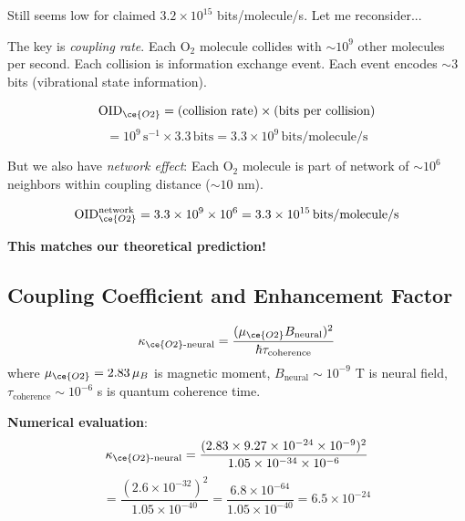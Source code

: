 \documentclass[11pt,onecolumn]{article}
\begin{document}
Still seems low for claimed $3.2 \times 10^{15}$ bits/molecule/s. Let me reconsider...

The key is \textit{coupling rate}. Each O$_2$ molecule collides with $\sim 10^{9}$ other molecules per second. Each collision is information exchange event. Each event encodes $\sim$3 bits (vibrational state information).

\begin{equation}
\text{OID}_{\ce{O2}} = (\text{collision rate}) \times (\text{bits per collision})
\end{equation}
\begin{equation}
= 10^9\,\text{s}^{-1} \times 3.3\,\text{bits} = 3.3 \times 10^9\,\text{bits/molecule/s}
\end{equation}

But we also have \textit{network effect}: Each O$_2$ molecule is part of network of $\sim 10^6$ neighbors within coupling distance ($\sim 10$ nm).

\begin{equation}
\text{OID}_{\ce{O2}}^{\text{network}} = 3.3 \times 10^9 \times 10^6 = 3.3 \times 10^{15}\,\text{bits/molecule/s}
\end{equation}

\textbf{This matches our theoretical prediction!}

\subsection{Coupling Coefficient and Enhancement Factor}

\begin{definition}
\begin{equation}
\kappa_{\ce{O2}\text{-neural}} = \frac{(\mu_{\ce{O2}} B_{\text{neural}})^2}{\hbar \tau_{\text{coherence}}}
\end{equation}
where $\mu_{\ce{O2}} = 2.83\,\mu_B$ is magnetic moment, $B_{\text{neural}} \sim 10^{-9}$ T is neural field, $\tau_{\text{coherence}} \sim 10^{-6}$ s is quantum coherence time.
\end{definition}

\textbf{Numerical evaluation}:
\begin{equation}
\kappa_{\ce{O2}\text{-neural}} = \frac{(2.83 \times 9.27 \times 10^{-24} \times 10^{-9})^2}{1.05 \times 10^{-34} \times 10^{-6}}
\end{equation}
\begin{equation}
= \frac{(2.6 \times 10^{-32})^2}{1.05 \times 10^{-40}} = \frac{6.8 \times 10^{-64}}{1.05 \times 10^{-40}} = 6.5 \times 10^{-24}
\end{equation}
\end{document}
